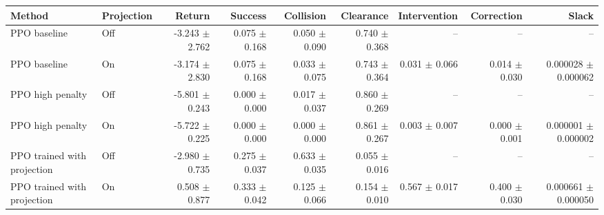\begin{tabular}{llrrrrrrr}
\toprule
Method & Projection & Return & Success & Collision & Clearance & Intervention & Correction & Slack \\
\midrule
PPO baseline & Off & -3.243 $\pm$ 2.762 & 0.075 $\pm$ 0.168 & 0.050 $\pm$ 0.090 & 0.740 $\pm$ 0.368 & -- & -- & -- \\
PPO baseline & On & -3.174 $\pm$ 2.830 & 0.075 $\pm$ 0.168 & 0.033 $\pm$ 0.075 & 0.743 $\pm$ 0.364 & 0.031 $\pm$ 0.066 & 0.014 $\pm$ 0.030 & 0.000028 $\pm$ 0.000062 \\
PPO high penalty & Off & -5.801 $\pm$ 0.243 & 0.000 $\pm$ 0.000 & 0.017 $\pm$ 0.037 & 0.860 $\pm$ 0.269 & -- & -- & -- \\
PPO high penalty & On & -5.722 $\pm$ 0.225 & 0.000 $\pm$ 0.000 & 0.000 $\pm$ 0.000 & 0.861 $\pm$ 0.267 & 0.003 $\pm$ 0.007 & 0.000 $\pm$ 0.001 & 0.000001 $\pm$ 0.000002 \\
PPO trained with projection & Off & -2.980 $\pm$ 0.735 & 0.275 $\pm$ 0.037 & 0.633 $\pm$ 0.035 & 0.055 $\pm$ 0.016 & -- & -- & -- \\
PPO trained with projection & On & 0.508 $\pm$ 0.877 & 0.333 $\pm$ 0.042 & 0.125 $\pm$ 0.066 & 0.154 $\pm$ 0.010 & 0.567 $\pm$ 0.017 & 0.400 $\pm$ 0.030 & 0.000661 $\pm$ 0.000050 \\
\bottomrule
\end{tabular}
